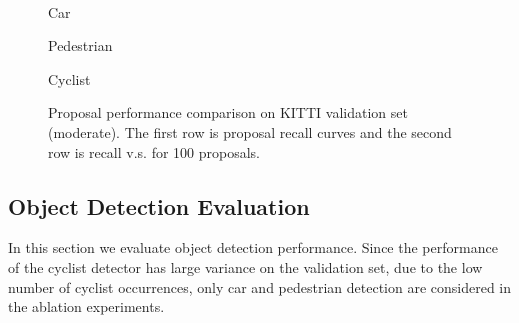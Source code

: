 \documentclass[runningheads]{llncs}
\begin{document}
\begin{figure*}[!t]
\begin{minipage}[b]{.32\linewidth}
\centering
\centerline{}
\end{minipage}
\hfill
\begin{minipage}[b]{.32\linewidth}
\centering
\centerline{}
\end{minipage}
\hfill
\begin{minipage}[b]{.32\linewidth}
\centering
\centerline{}
\end{minipage}\\
\hfill
\begin{minipage}[b]{.32\linewidth}
\centering
\centerline{}{Car}
\end{minipage}
\hfill
\begin{minipage}[b]{.32\linewidth}
\centering
\centerline{}{Pedestrian}
\end{minipage}
\hfill
\begin{minipage}[b]{.32\linewidth}
\centering
\centerline{}{Cyclist}
\end{minipage}
\caption{Proposal performance comparison on KITTI validation set (moderate). The first row is proposal recall curves and the second row is recall v.s.  for 100 proposals.}
\label{fig:kitti proposal}
\end{figure*}





\subsection{Object Detection Evaluation}

In this section we evaluate object detection performance.
Since the performance of the cyclist detector has large variance on the
validation set, due to the low number of cyclist occurrences,
only car and pedestrian detection are considered in the ablation experiments.
\end{document}
